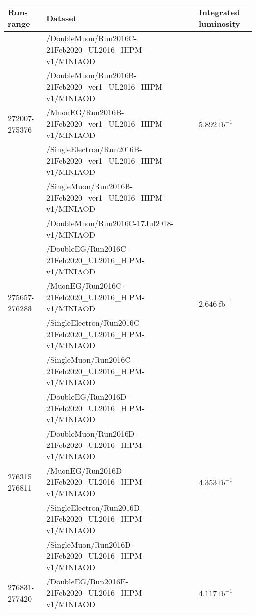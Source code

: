 \begin{table}[h]
        \tiny
	\centering
	\begin{tabular}{|l|l|l|} 
		\hline %
		\hline %
		Run-range & Dataset & Integrated luminosity \\
		\hline %
		\hline %
		\multirow{5}{*}{272007-275376} & /DoubleMuon/Run2016C-21Feb2020\_UL2016\_HIPM-v1/MINIAOD &  \multirow{5}{*}{$5.892\ \text{fb}^{-1}$} \\ 
		& /DoubleMuon/Run2016B-21Feb2020\_ver1\_UL2016\_HIPM-v1/MINIAOD &  \\ 
		& /MuonEG/Run2016B-21Feb2020\_ver1\_UL2016\_HIPM-v1/MINIAOD &  \\ 
		& /SingleElectron/Run2016B-21Feb2020\_ver1\_UL2016\_HIPM-v1/MINIAOD &  \\ 
		& /SingleMuon/Run2016B-21Feb2020\_ver1\_UL2016\_HIPM-v1/MINIAOD &  \\ 
		\hline
		\multirow{5}{*}{275657-276283} & /DoubleMuon/Run2016C-17Jul2018-v1/MINIAOD &  \multirow{5}{*}{$2.646\ \text{fb}^{-1}$}  \\ 
		& /DoubleEG/Run2016C-21Feb2020\_UL2016\_HIPM-v1/MINIAOD &  \\ 
		& /MuonEG/Run2016C-21Feb2020\_UL2016\_HIPM-v1/MINIAOD &  \\ 
		& /SingleElectron/Run2016C-21Feb2020\_UL2016\_HIPM-v1/MINIAOD &  \\ 
		& /SingleMuon/Run2016C-21Feb2020\_UL2016\_HIPM-v1/MINIAOD &  \\ 
		\hline
		\multirow{5}{*}{276315-276811} & /DoubleEG/Run2016D-21Feb2020\_UL2016\_HIPM-v1/MINIAOD &  \multirow{5}{*}{$4.353\ \text{fb}^{-1}$} \\ 
		& /DoubleMuon/Run2016D-21Feb2020\_UL2016\_HIPM-v1/MINIAOD &  \\ 
		& /MuonEG/Run2016D-21Feb2020\_UL2016\_HIPM-v1/MINIAOD &  \\ 
		& /SingleElectron/Run2016D-21Feb2020\_UL2016\_HIPM-v1/MINIAOD &  \\ 
		& /SingleMuon/Run2016D-21Feb2020\_UL2016\_HIPM-v1/MINIAOD &  \\ 
		\hline
		\multirow{5}{*}{276831-277420} & /DoubleEG/Run2016E-21Feb2020\_UL2016\_HIPM-v1/MINIAOD &  \multirow{5}{*}{$4.117\ \text{fb}^{-1}$} \\ 

\end{tabular}
\end{table}
